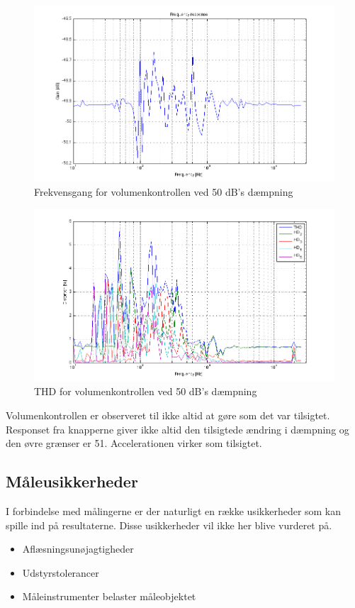 \begin{figure}[h]
\centering
\includegraphics[width=\textwidth]{maalerapporter/volumenkontrol/2Vniveau50-frek.png}
\caption{Frekvensgang for volumenkontrollen ved 50 dB's dæmpning}
\end{figure}

\begin{figure}[h]
\centering
\includegraphics[width=\textwidth]{maalerapporter/volumenkontrol/2Vniveau50-thd.png}
\caption{THD for volumenkontrollen ved 50 dB's dæmpning}
\label{fig:apvold:thd50}
\end{figure}

Volumenkontrollen er observeret til ikke altid at gøre som det var tilsigtet. Responset fra knapperne giver ikke altid den tilsigtede ændring i dæmpning og den øvre grænser er 51. Accelerationen virker som tilsigtet.

\subsection*{Måleusikkerheder}
I forbindelse med målingerne er der naturligt en række usikkerheder som kan spille ind på resultaterne. Disse usikkerheder vil ikke her blive vurderet på. 

\begin{itemize}
\item Aflæsningsunøjagtigheder
\item Udstyrstolerancer
\item Måleinstrumenter belaster måleobjektet
\end{itemize}